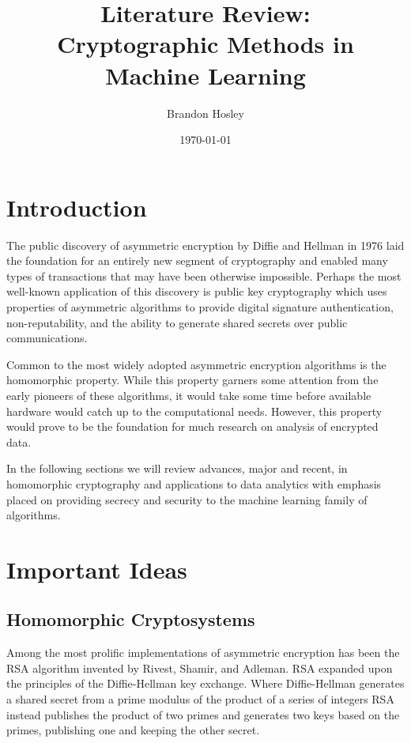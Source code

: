 \documentclass[]{article}
\title{Literature Review: \\ Cryptographic Methods in Machine Learning}
\author{Brandon Hosley}
\date{\today}
\begin{document}
	\maketitle
	\clearpage
	
\section{Introduction} 

The public discovery of asymmetric encryption by Diffie and Hellman in 1976 \cite{Diffie1976} 
laid the foundation for an entirely new segment of cryptography and enabled many types of transactions that may have been otherwise impossible. 
Perhaps the most well-known application of this discovery is public key cryptography which uses properties of asymmetric algorithms to provide digital signature authentication, non-reputability, and the ability to generate shared secrets over public communications. 

Common to the most widely adopted asymmetric encryption algorithms is the homomorphic property. 
While this property garners some attention from the early pioneers of these algorithms, it would take some time before available hardware would catch up to the computational needs.
However, this property would prove to be the foundation for much research on analysis of encrypted data. 

In the following sections we will review advances, major and recent, in homomorphic cryptography and applications to data analytics with emphasis placed on providing secrecy and security to the machine learning family of algorithms.

\section{Important Ideas}
	\subsection{Homomorphic Cryptosystems}
	
Among the most prolific implementations of asymmetric encryption has been the RSA algorithm invented by Rivest, Shamir, and Adleman.\cite{Rivest1978}
RSA expanded upon the principles of the Diffie-Hellman key exchange.
Where Diffie-Hellman generates a shared secret from a prime modulus of the product of a series of integers
RSA instead publishes the product of two primes and generates two keys based on the primes, publishing one and keeping the other secret.
\end{document}

